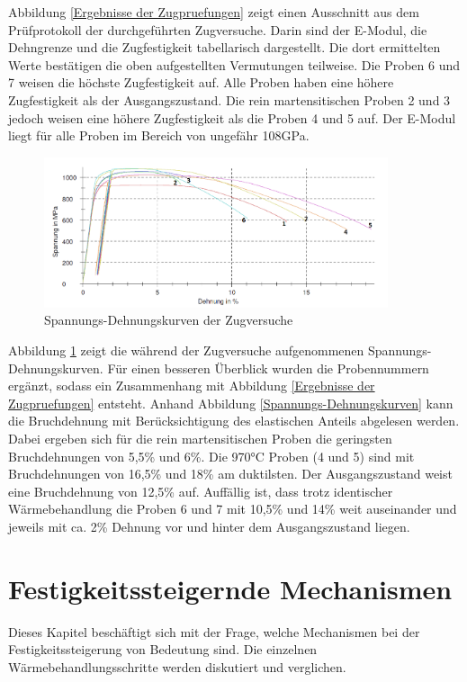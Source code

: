 \documentclass[a4paper, 11pt]{tubsreprt}
\begin{document}
Abbildung \ref{Ergebnisse der Zugpruefungen} zeigt einen Ausschnitt aus dem Prüfprotokoll der durchgeführten Zugversuche. Darin sind der E-Modul, die Dehngrenze und die Zugfestigkeit tabellarisch dargestellt. Die dort ermittelten Werte bestätigen die oben aufgestellten Vermutungen teilweise. Die Proben 6 und 7 weisen die höchste Zugfestigkeit auf. Alle Proben haben eine höhere Zugfestigkeit als der Ausgangszustand. Die rein martensitischen Proben 2 und 3 jedoch weisen eine höhere Zugfestigkeit als die Proben 4 und 5 auf. Der E-Modul liegt für alle Proben im Bereich von ungefähr 108GPa.

\begin{figure}
\centering
\includegraphics[width=0.9\textwidth]{Bilder/Zugpruefverluaufe.png}
\caption{Spannungs-Dehnungskurven der Zugversuche}
\label{Spannungs Dehnungskurven}
\end{figure}

Abbildung \ref{Spannungs Dehnungskurven} zeigt die während der Zugversuche aufgenommenen Spannungs-Dehnungskurven. Für einen besseren Überblick wurden die Probennummern ergänzt, sodass ein Zusammenhang mit Abbildung \ref{Ergebnisse der Zugpruefungen} entsteht. Anhand Abbildung \ref{Spannungs-Dehnungskurven} kann die Bruchdehnung mit Berücksichtigung des elastischen Anteils abgelesen werden. Dabei ergeben sich für die rein martensitischen Proben die geringsten Bruchdehnungen  von 5,5\% und 6\%. Die 970°C Proben (4 und 5) sind mit Bruchdehnungen von 16,5\% und 18\% am duktilsten. Der Ausgangszustand weist eine Bruchdehnung von 12,5\% auf. Auffällig ist, dass trotz identischer Wärmebehandlung die Proben 6 und 7 mit 10,5\% und 14\% weit auseinander und jeweils mit ca. 2\% Dehnung vor und hinter dem Ausgangszustand liegen.
\chapter{Festigkeitssteigernde Mechanismen}
Dieses Kapitel beschäftigt sich mit der Frage, welche Mechanismen bei der Festigkeitssteigerung von Bedeutung sind. Die einzelnen Wärmebehandlungsschritte werden diskutiert und verglichen.
\end{document}
